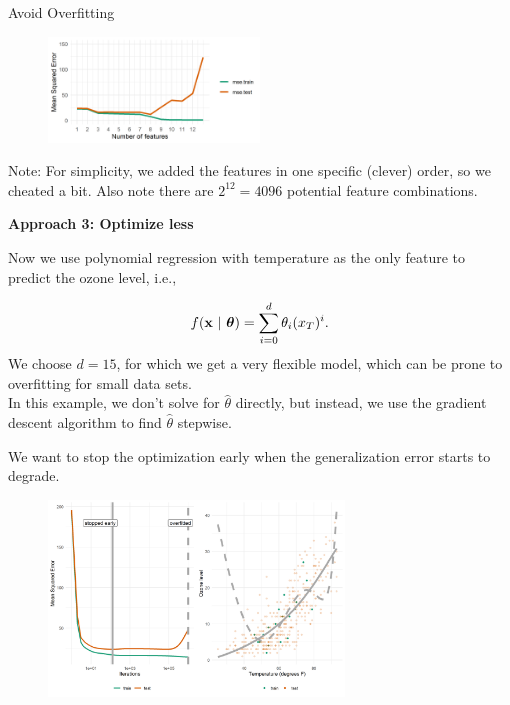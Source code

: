 \documentclass[11pt,compress,t,notes=noshow, xcolor=table]{beamer}
\begin{document}
\begin{vbframe}{Avoid Overfitting}
\begin{figure}
\includegraphics[width=0.5\textwidth]{figure/avoid_overfitting_02.png}\\
\end{figure}


\begin{footnotesize}
Note: For simplicity, we added the features in one specific (clever) order, so we cheated a bit. Also note there are $2^{12} = 4096$ potential feature combinations.
\end{footnotesize}

\framebreak

\textbf{Approach 3: Optimize less}

\lz 

Now we use polynomial regression with temperature as the only feature to predict the ozone level, i.e.,

$$f(\mathbf{x} ~|~ \bm{\theta}) = \sum^{d}_{i=0} \theta_i (x_T)^{i} .$$
We choose $d = 15$, for which we get a very flexible model, which can be prone to overfitting for small data sets. \\
\medskip
In this example, we don't solve for $\hat\theta$ directly, but instead, we use the gradient descent algorithm to find $\hat\theta$ stepwise.

\framebreak

We want to stop the optimization early when the generalization error starts to degrade.


\begin{figure}
\includegraphics[width=0.7\textwidth]{figure/early_stopping.png}\\
\end{figure}


\end{vbframe}
\end{document}
